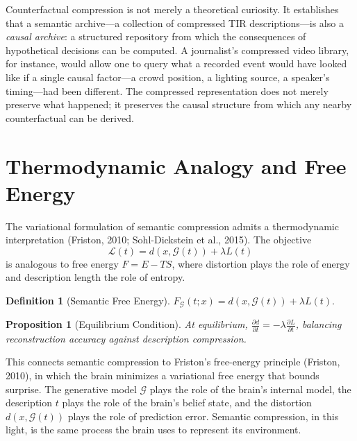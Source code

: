 \documentclass[11pt,a4paper]{article}
\newtheorem{proposition}[theorem]{Proposition}
\theoremstyle{definition}
\newtheorem{definition}[theorem]{Definition}
\theoremstyle{remark}
\begin{document}
Counterfactual compression is not merely a theoretical curiosity. It establishes that a semantic archive---a collection of compressed TIR descriptions---is also a \emph{causal archive}: a structured repository from which the consequences of hypothetical decisions can be computed. A journalist's compressed video library, for instance, would allow one to query what a recorded event would have looked like if a single causal factor---a crowd position, a lighting source, a speaker's timing---had been different. The compressed representation does not merely preserve what happened; it preserves the causal structure from which any nearby counterfactual can be derived.

\section{Thermodynamic Analogy and Free Energy}
\label{sec:thermodynamics}

The variational formulation of semantic compression admits a thermodynamic interpretation (Friston, 2010; Sohl-Dickstein et al., 2015). The objective
\[
\mathcal{L}(t) = d(x, \mathcal{G}(t)) + \lambda L(t)
\]
is analogous to free energy $F = E - TS$, where distortion plays the role of energy and description length the role of entropy.

\begin{definition}[Semantic Free Energy]
$F_{\mathcal{G}}(t; x) = d(x, \mathcal{G}(t)) + \lambda L(t)$.
\end{definition}

\begin{proposition}[Equilibrium Condition]
At equilibrium, $\frac{\partial d}{\partial t} = -\lambda \frac{\partial L}{\partial t}$, balancing reconstruction accuracy against description compression.
\end{proposition}

This connects semantic compression to Friston's free-energy principle (Friston, 2010), in which the brain minimizes a variational free energy that bounds surprise. The generative model $\mathcal{G}$ plays the role of the brain's internal model, the description $t$ plays the role of the brain's belief state, and the distortion $d(x, \mathcal{G}(t))$ plays the role of prediction error. Semantic compression, in this light, is the same process the brain uses to represent its environment.
\end{document}
